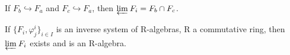 \documentclass[../category_theory.tex]{subfiles}
\begin{document}
\begin{example}
\begin{itemize}
\begin{center}
		      \end{center}
		      If \(F_{b} \hookrightarrow F_{a}\) and \(F_{c}\hookrightarrow F_{a}\), then \(\varprojlim_{}F_{i}=F_{b}\cap F_{c}\).
	\end{itemize}
\end{example}
\begin{exr}
	If \(\{F_{i}, \varphi_{j}^{i}\}_{i\in I}\) is an inverse system of R-algebras, R a commutative ring, then \(\varprojlim_{}F_{i}\) exists and is an R-algebra.
\end{exr}
\end{document}
